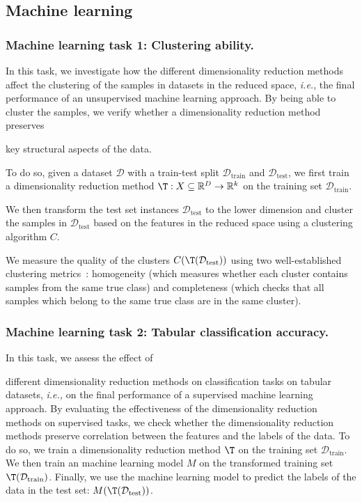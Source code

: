 \subsection{Machine learning}
\subsubsection*{Machine learning task 1: Clustering ability.}
\label{sec:ch04:method-ml-task1}

In this task, we investigate how the different dimensionality reduction methods affect the clustering of the samples in datasets in the reduced space, \emph{i.e.}, the final performance of an unsupervised machine learning approach.
By being able to cluster the samples, we verify whether a dimensionality reduction method preserves 

key structural aspects of the data.


To do so, given a dataset $\mathcal{D}$ with a train-test split $\mathcal{D}_{\text{train}}$ and $\mathcal{D}_{\text{test}}$, we first train a dimensionality reduction method $\T: X \subseteq \mathbb{R}^D\rightarrow \mathbb{R}^k$ on the training set $\mathcal{D}_{\text{train}}$. 


We then transform the test set instances $\mathcal{D}_{\text{test}}$ to the lower dimension and cluster the samples in $\mathcal{D}_{\text{test}}$ based on the features in the reduced space using a clustering algorithm $C$.


We measure the quality of the clusters $C(\T(\mathcal{D}_{\text{test}}))$ using two well-established clustering metrics~\citep{RosHir07}: homogeneity (which measures whether each cluster contains samples from the same true class) and completeness (which checks that all samples which belong to the same true class are in the same cluster).




\subsubsection*{Machine learning task 2: Tabular classification accuracy.}
\label{sec:ch04:method-ml-task2}

In this task, we assess the effect of 

different dimensionality reduction methods on classification tasks on tabular datasets, \emph{i.e.,} on the final performance of a supervised machine learning approach.
By evaluating the effectiveness of the dimensionality reduction methods on supervised tasks, we check whether the dimensionality reduction methods preserve correlation between the features and the labels of the data.
To do so, we train a dimensionality reduction method $\T$ on the training set $\mathcal{D}_{\text{train}}$. We then train an machine learning model $M$ on the transformed training set $\T(\mathcal{D}_{\text{train}})$. Finally, we use the machine learning model to predict the labels of the data in the test set: $M(\T(\mathcal{D}_{\text{test}}))$.

